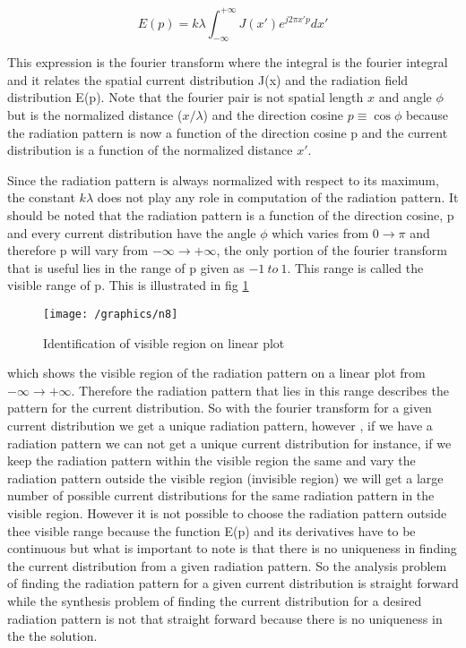 \begin{equation}
E(p) = k\lambda\int_{-\infty}^{+\infty}J(x') e^{j2\pi x' p}dx'
\label{eqn30}	
\end{equation}

This expression is the fourier transform where  the integral is the fourier integral and it relates the spatial current distribution J(x) and the radiation field distribution E(p). Note that the fourier pair is not spatial length $x$ and angle  $\phi$ but is the normalized distance  ($x/\lambda$) and the direction cosine $ p \equiv \cos\phi$ because the radiation pattern is now a function of the direction cosine p and the current distribution is a function of the normalized distance $x'$.

Since the radiation pattern is always normalized with respect to its maximum, the constant $k\lambda$ does not play any role in computation of the radiation pattern. It should be noted that the radiation pattern is a function of the direction cosine, p and every current distribution have the angle $\phi$ which varies from $0\to\pi$ and therefore p will vary from $-\infty\to +\infty$, the only portion of the fourier transform that is useful lies in the range of p given as $-1 \ to\ 1$. This range is called the visible range of p. This is illustrated in fig \ref{fig:8}
\begin{figure}[h]
\centering
\texttt{[image: /graphics/n8]}
\caption{Identification of visible region on linear plot}
\label{fig:8}
\end{figure}

which shows the visible region of the radiation pattern on a linear plot from $-\infty\to +\infty$. Therefore the radiation pattern that lies in this range describes the pattern for the current distribution. So with the fourier transform for a given current distribution we get a unique radiation pattern, however , if we have a radiation pattern we can not get a unique current distribution for instance, if we keep the radiation pattern within the visible region the same and vary the radiation pattern outside the visible region (invisible region) we will get a large number of possible current distributions for the same radiation pattern in the visible region. However it is not possible to choose the radiation pattern outside thee visible range because the function E(p) and its derivatives have to be continuous but what is important to note is that there is no uniqueness in finding the current distribution from a given radiation pattern. So the analysis problem of finding the radiation pattern for a given current distribution is straight forward while the synthesis problem of finding the current distribution for  a desired radiation pattern is not that straight forward because there is no uniqueness in the the solution.

